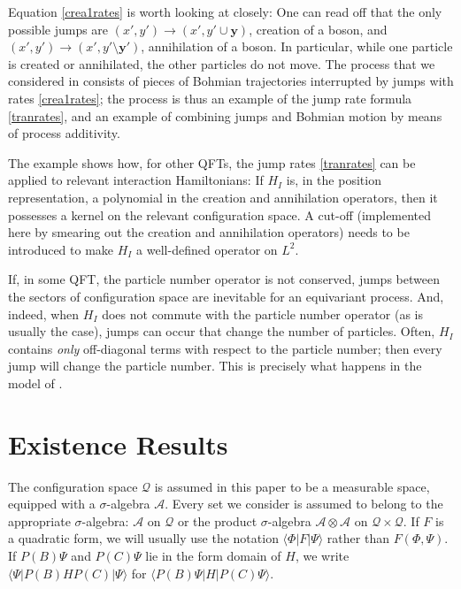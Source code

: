 \documentclass[12pt]{article}
\newcommand{\1}{\mathbf{1}} %
\renewcommand{\sp}[2]{\langle #1 | #2 \rangle} %
\newcommand{\conf}{\mathcal{Q}} %
\newcommand{\salg}{\mathcal{A}} %
\newcommand{\pov}{{P}}%
\newcommand{\form}{{F}}%
\newcommand{\vy}{{\boldsymbol y}}
\newcommand{\inter}{{I}} %
\begin{document}
Equation \eqref{crea1rates} is worth looking at closely: One can read
off that the only possible jumps are $(x',y') \to (x',y' \cup \vy)$,
creation of a boson, and $(x',y') \to (x',y' \setminus \vy')$,
annihilation of a boson. In particular, while one particle is created
or annihilated, the other particles do not move. The process that we
considered in \cite{crea1} consists of pieces of Bohmian trajectories
interrupted by jumps with rates \eqref{crea1rates}; the process is
thus an example of the jump rate formula \eqref{tranrates}, and an
example of combining jumps and Bohmian motion by means of process
additivity.

The example shows how, for other QFTs, the jump rates
\eqref{tranrates} can be applied to relevant interaction Hamiltonians:
If $H_\inter$ is, in the position representation, a polynomial in the
creation and annihilation operators, then it possesses a kernel on the
relevant configuration space. A cut-off (implemented here by smearing
out the creation and annihilation operators) needs to be introduced to
make $H_\inter$ a well-defined operator on $L^2$.

If, in some QFT, the particle number operator is not conserved, jumps
between the sectors of configuration space are inevitable for an
equivariant process. And, indeed, when $H_\inter$ does not commute
with the particle number operator (as is usually the case), jumps can
occur that change the number of particles. Often, $H_\inter$ contains
\emph{only} off-diagonal terms with respect to the particle number;
then every jump will change the particle number.  This is precisely
what happens in the model of \cite{crea1}.






\section{Existence Results}
\label{sec:maths}

The configuration space $\conf$ is assumed in this paper to be a
measurable space, equipped with a $\sigma$-algebra $\salg$.  Every set
we consider is assumed to belong to the appropriate $\sigma$-algebra:
$\salg$ on $\conf$ or the product $\sigma$-algebra $\salg \otimes
\salg$ on $\conf \times \conf$. If $\form$ is a quadratic form, we
will usually use the notation $\sp{\Phi} {\form | \Psi}$ rather than
$\form (\Phi,\Psi)$.  If $\pov(B)\Psi$ and $\pov(C)\Psi$ lie in the
form domain of $H$, we write $\sp{\Psi}{\pov(B) H \pov(C)|\Psi}$ for
$\sp{\pov(B)\Psi}{H|\pov(C)\Psi}$.
\end{document}
